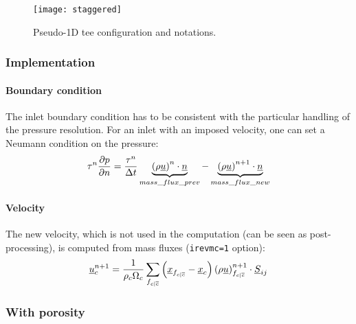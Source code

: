 \begin{figure}
    \centering
    \texttt{[image: staggered]}
    \caption{Pseudo-1D tee configuration and notations.}
    \label{fig:geometry}
\end{figure}

\subsubsection{Implementation}

\paragraph{Boundary condition} The inlet boundary condition has to be
consistent with the particular handling of the pressure resolution. For an
inlet with an imposed velocity, one can set a Neumann condition on the
pressure:
\begin{equation}
\tau^{n}\frac{\partial p}{\partial n}=\frac{\tau^{n}}{\Delta t}\underbrace{\left(\rho\underline{u}\right)^{n}\cdot\underline{n}}_{mass\_flux\_prev}-\underbrace{\left(\rho\underline{u}\right)^{n+1}\cdot\underline{n}}_{mass\_flux\_new}
\end{equation}

\paragraph{Velocity} The new velocity, which is not used in the computation
(can be seen as post-processing), is computed from mass fluxes
(\texttt{irevmc=1} option):
\begin{equation}
    \underline{u}_{c}^{n+1}=\frac{1}{\rho_{c}\Omega_{c}}\sum_{{{f}_{c|{\overline{c}}}}}\left(\underline{x}_{{{f}_{c|{\overline{c}}}}}-\underline{x}_{c}\right)\left(\rho\underline{u}\right)_{{{f}_{c|{\overline{c}}}}}^{n+1}\cdot\underline{S}_{{ij}}
\end{equation}

\subsubsection{With porosity}

